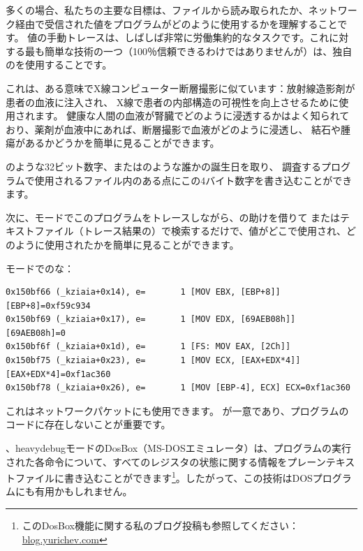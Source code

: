 
多くの場合、私たちの主要な目標は、ファイルから読み取られたか、ネットワーク経由で受信された値をプログラムがどのように使用するかを理解することです。
値の手動トレースは、しばしば非常に労働集約的なタスクです。これに対する最も簡単な技術の一つ（100％信頼できるわけではありませんが）は、独自のを使用することです。

これは、ある意味でX線コンピューター断層撮影に似ています：放射線造影剤が患者の血液に注入され、
X線で患者の内部構造の可視性を向上させるために使用されます。
健康な人間の血液が腎臓でどのように浸透するかはよく知られており、薬剤が血液中にあれば、断層撮影で血液がどのように浸透し、
結石や腫瘍があるかどうかを簡単に見ることができます。

のような32ビット数字、またはのような誰かの誕生日を取り、
調査するプログラムで使用されるファイル内のある点にこの4バイト数字を書き込むことができます。

\myindex{\GrepUsage}

次に、モードでこのプログラムをトレースしながら、の助けを借りて
またはテキストファイル（トレース結果の）で検索するだけで、値がどこで使用され、どのように使用されたかを簡単に見ることができます。

モードでのな：

\begin{lstlisting}[style=customasmx86]
0x150bf66 (_kziaia+0x14), e=       1 [MOV EBX, [EBP+8]] [EBP+8]=0xf59c934 
0x150bf69 (_kziaia+0x17), e=       1 [MOV EDX, [69AEB08h]] [69AEB08h]=0 
0x150bf6f (_kziaia+0x1d), e=       1 [FS: MOV EAX, [2Ch]] 
0x150bf75 (_kziaia+0x23), e=       1 [MOV ECX, [EAX+EDX*4]] [EAX+EDX*4]=0xf1ac360 
0x150bf78 (_kziaia+0x26), e=       1 [MOV [EBP-4], ECX] ECX=0xf1ac360 
\end{lstlisting}

これはネットワークパケットにも使用できます。
が一意であり、プログラムのコードに存在しないことが重要です。

\newcommand{\DOSBOXURL}{\href{http://go.yurichev.com/17222}{blog.yurichev.com}}

、heavydebugモードのDosBox（MS-DOSエミュレータ）は、プログラムの実行された各命令について、すべてのレジスタの状態に関する情報をプレーンテキストファイルに書き込むことができます\footnote{このDosBox機能に関する私のブログ投稿も参照してください：\DOSBOXURL{}}。したがって、この技術はDOSプログラムにも有用かもしれません。